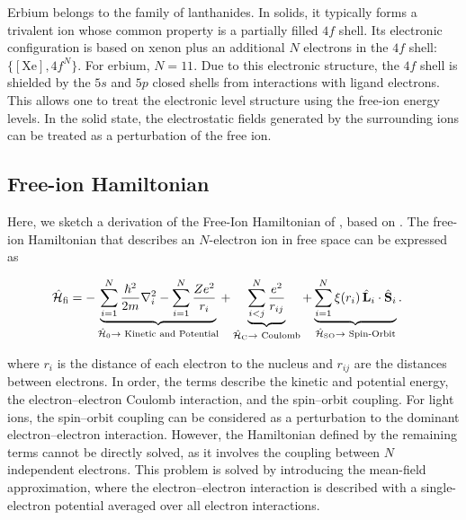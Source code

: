 Erbium belongs to the family of lanthanides. In solids, it typically forms a trivalent ion whose common property is a partially filled $4f$ shell. Its electronic configuration is based on xenon plus an additional $N$ electrons in the $4f$ shell: $\{[\mathrm{Xe}], 4f^{N}\}$. For erbium, $N=11$. Due to this electronic structure, the $4f$ shell is shielded by the $5s$ and $5p$ closed shells from interactions with ligand electrons. This allows one to treat the electronic level structure using the free-ion energy levels. In the solid state, the electrostatic fields generated by the surrounding ions can be treated as a perturbation of the free ion.

\subsection{Free-ion Hamiltonian}

Here, we sketch a derivation of the Free-Ion Hamiltonian of \Er, based on . %
The free-ion Hamiltonian that describes an $N$-electron ion in free space can be expressed as

\begin{align}
\begin{split}
    \hat{\mathcal{H}}_{\text{fi}} &= -\underbrace{\sum_{i=1}^N \frac{\hbar^2}{2m} \nabla_i^2 - \sum_{i=1}^N \frac{Ze^2}{r_i}}_{\hat{\mathcal{H}}_{\text{0}} \rightarrow \text{ Kinetic and Potential}} + \underbrace{\sum_{i<j}^N \frac{e^2}{r_{ij}}}_{\hat{\mathcal{H}}_{\text{C}} \rightarrow \text{ Coulomb}} + \underbrace{\sum_{i=1}^N \xi(r_i)\,\hat{\mathbf{L}}_i \cdot \hat{\mathbf{S}}_i}_{\hat{\mathcal{H}}_{\text{SO}} \rightarrow \text{ Spin-Orbit}}.
\end{split}
\end{align}

where $r_i$ is the distance of each electron to the nucleus and $r_{ij}$ are the distances between electrons. In order, the terms describe the kinetic and potential energy, the electron--electron Coulomb interaction, and the spin--orbit coupling. For light ions, the spin--orbit coupling can be considered as a perturbation to the dominant electron--electron interaction. However, the Hamiltonian defined by the remaining terms cannot be directly solved, as it involves the coupling between $N$ independent electrons. This problem is solved by introducing the mean-field approximation, where the electron--electron interaction is described with a single-electron potential averaged over all electron interactions. 


